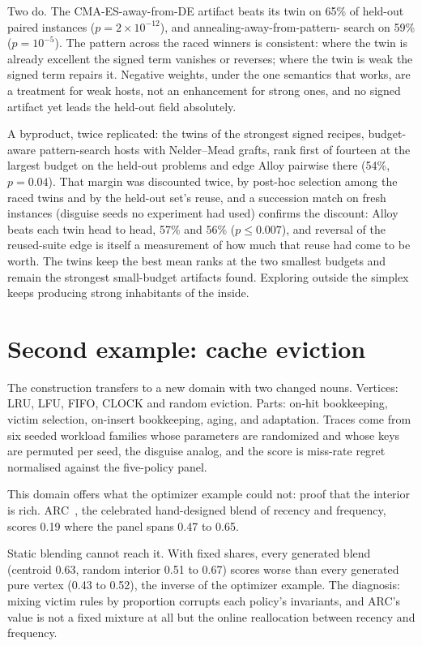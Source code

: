 \documentclass[11pt]{article}
\begin{document}
Two do. The CMA-ES-away-from-DE artifact beats its twin on 65\% of held-out
paired instances ($p = 2\times10^{-12}$), and annealing-away-from-pattern-%
search on 59\% ($p = 10^{-5}$). The pattern across the raced winners is
consistent: where the twin is already excellent the signed term vanishes or
reverses; where the twin is weak the signed term repairs it. Negative
weights, under the one semantics that works, are a treatment for weak
hosts, not an enhancement for strong ones, and no signed artifact yet leads
the held-out field absolutely.

A byproduct, twice replicated: the twins of the strongest signed recipes,
budget-aware pattern-search hosts with Nelder--Mead grafts, rank first of
fourteen at the largest budget on the held-out problems and edge Alloy
pairwise there (54\%, $p = 0.04$). That margin was discounted twice, by
post-hoc selection among the raced twins and by the held-out set's reuse,
and a succession match on fresh instances (disguise seeds no experiment had
used) confirms the discount: Alloy beats each twin head to head, 57\% and
56\% ($p \le 0.007$), and reversal of the reused-suite edge is itself a
measurement of how much that reuse had come to be worth. The twins keep the
best mean ranks at the two smallest budgets and remain the strongest
small-budget artifacts found. Exploring outside the simplex keeps producing
strong inhabitants of the inside.

\section{Second example: cache eviction}
\label{sec:cache}

The construction transfers to a new domain with two changed nouns. Vertices:
LRU, LFU, FIFO, CLOCK and random eviction. Parts: on-hit bookkeeping, victim
selection, on-insert bookkeeping, aging, and adaptation. Traces come from
six seeded workload families whose parameters are randomized and whose keys
are permuted per seed, the disguise analog, and the score is miss-rate
regret normalised against the five-policy panel.

This domain offers what the optimizer example could not: proof that the
interior is rich. ARC~\cite{megiddo2003}, the celebrated hand-designed
blend of recency and frequency, scores 0.19 where the panel spans 0.47 to
0.65.

Static blending cannot reach it. With fixed shares, every generated blend
(centroid 0.63, random interior 0.51 to 0.67) scores worse than every
generated pure vertex (0.43 to 0.52), the inverse of the optimizer example.
The diagnosis: mixing victim rules by proportion corrupts each policy's
invariants, and ARC's value is not a fixed mixture at all but the online
reallocation between recency and frequency.
\end{document}
